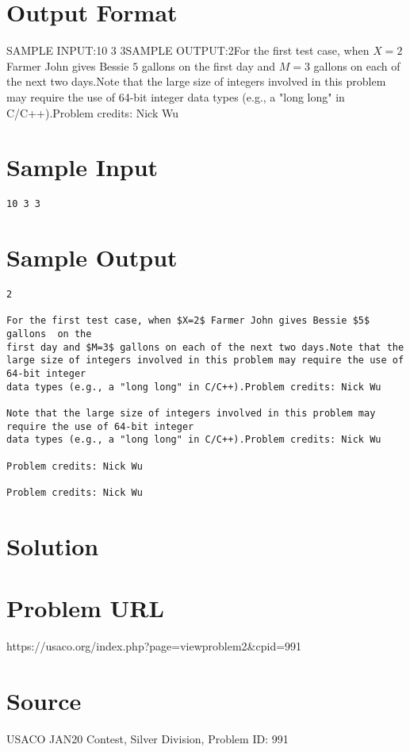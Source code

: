 \documentclass[12pt]{article}
\begin{document}
\section*{Output Format}
SAMPLE INPUT:10 3 3SAMPLE OUTPUT:2For the first test case, when $X=2$ Farmer John gives Bessie $5$ gallons  on the
first day and $M=3$ gallons on each of the next two days.Note that the large size of integers involved in this problem may require the use of 64-bit integer
data types (e.g., a "long long" in C/C++).Problem credits: Nick Wu

\section*{Sample Input}
\begin{verbatim}
10 3 3
\end{verbatim}

\section*{Sample Output}
\begin{verbatim}
2

For the first test case, when $X=2$ Farmer John gives Bessie $5$ gallons  on the
first day and $M=3$ gallons on each of the next two days.Note that the large size of integers involved in this problem may require the use of 64-bit integer
data types (e.g., a "long long" in C/C++).Problem credits: Nick Wu

Note that the large size of integers involved in this problem may require the use of 64-bit integer
data types (e.g., a "long long" in C/C++).Problem credits: Nick Wu

Problem credits: Nick Wu

Problem credits: Nick Wu
\end{verbatim}

\section*{Solution}


\section*{Problem URL}
https://usaco.org/index.php?page=viewproblem2&cpid=991

\section*{Source}
USACO JAN20 Contest, Silver Division, Problem ID: 991
\end{document}
